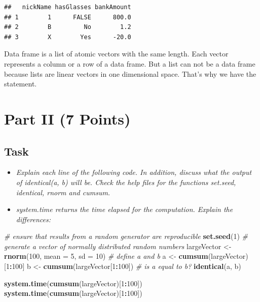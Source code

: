 \documentclass[12,]{article}
\newenvironment{Shaded}{\begin{snugshade}}{\end{snugshade}}
\newcommand{\KeywordTok}[1]{\textcolor[rgb]{0.13,0.29,0.53}{\textbf{#1}}}
\newcommand{\DataTypeTok}[1]{\textcolor[rgb]{0.13,0.29,0.53}{#1}}
\newcommand{\DecValTok}[1]{\textcolor[rgb]{0.00,0.00,0.81}{#1}}
\newcommand{\StringTok}[1]{\textcolor[rgb]{0.31,0.60,0.02}{#1}}
\newcommand{\CommentTok}[1]{\textcolor[rgb]{0.56,0.35,0.01}{\textit{#1}}}
\newcommand{\OperatorTok}[1]{\textcolor[rgb]{0.81,0.36,0.00}{\textbf{#1}}}
\newcommand{\NormalTok}[1]{#1}
\providecommand{\tightlist}{%
  \setlength{\itemsep}{0pt}\setlength{\parskip}{0pt}}
\begin{document}
\begin{verbatim}
##   nickName hasGlasses bankAmount
## 1        1      FALSE      800.0
## 2        B         No        1.2
## 3        X        Yes      -20.0
\end{verbatim}

Data frame is a list of atomic vectors with the same length. Each vector
represents a column or a row of a data frame. But a list can not be a
data frame because lists are linear vectors in one dimensional space.
That's why we have the statement.

\section{Part II (7 Points)}\label{part-ii-7-points}

\subsection{Task}\label{task-1}

\begin{itemize}
\tightlist
\item
  \emph{Explain each line of the following code. In addition, discuss
  what the output of identical(a, b) will be. Check the help files for
  the functions set.seed, identical, rnorm and cumsum.}
\item
  \emph{system.time returns the time elapsed for the computation.
  Explain the differences:}
\end{itemize}

\begin{Shaded}
\begin{Highlighting}[]
  \CommentTok{# ensure that results from a random generator are reproducible}
\KeywordTok{set.seed}\NormalTok{(}\DecValTok{1}\NormalTok{)}
  \CommentTok{# generate a vector of normally distributed random numbers}
\NormalTok{largeVector <-}\StringTok{ }\KeywordTok{rnorm}\NormalTok{(}\DecValTok{100}\NormalTok{, }\DataTypeTok{mean =} \DecValTok{5}\NormalTok{, }\DataTypeTok{sd =} \DecValTok{10}\NormalTok{) }
  \CommentTok{# define a and b}
\NormalTok{a <-}\StringTok{ }\KeywordTok{cumsum}\NormalTok{(largeVector)[}\DecValTok{1}\OperatorTok{:}\DecValTok{100}\NormalTok{] }
\NormalTok{b <-}\StringTok{ }\KeywordTok{cumsum}\NormalTok{(largeVector[}\DecValTok{1}\OperatorTok{:}\DecValTok{100}\NormalTok{])}
  \CommentTok{# is a equal to b?}
\KeywordTok{identical}\NormalTok{(a, b) }

\KeywordTok{system.time}\NormalTok{(}\KeywordTok{cumsum}\NormalTok{(largeVector)[}\DecValTok{1}\OperatorTok{:}\DecValTok{100}\NormalTok{])}
\KeywordTok{system.time}\NormalTok{(}\KeywordTok{cumsum}\NormalTok{(largeVector)[}\DecValTok{1}\OperatorTok{:}\DecValTok{100}\NormalTok{])}
\end{Highlighting}
\end{Shaded}
\end{document}
